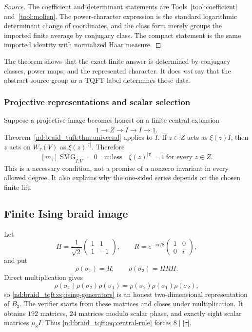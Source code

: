 \documentclass[10pt]{article}
\newcommand{\SMG}{\operatorname{SMG}}
\newcommand{\MGF}{\SMG}
\begin{document}
\begin{proof}[Source]
The coefficient and determinant statements are Tools~\ref{tool:coefficient}
and~\ref{tool:molien}.  The power-character expression is the standard
logarithmic determinant change of coordinates, and the class form merely
groups the imported finite average by conjugacy class.  The compact statement
is the same imported identity with normalized Haar measure.
\end{proof}

The theorem shows that the exact finite answer is determined by conjugacy
classes, power maps, and the represented character.  It does \emph{not} say
that the abstract source group or a TQFT label determines those data.

\subsubsection{Projective representations and scalar selection}

Suppose a projective image becomes honest on a finite central extension
\[
1\longrightarrow Z\longrightarrow\widetilde I\longrightarrow I
\longrightarrow1.
\]
Theorem~\ref{nd:braid_tqft:thm:universal} applies to $\widetilde I$.  If $z\in Z$ acts as
$\xi(z)I$, then $z$ acts on $W_\tau(V)$ as $\xi(z)^{|\tau|}$.  Therefore
\begin{equation}\label{nd:braid_tqft:eq:central-rule}
[m_\tau]\MGF_{\widetilde I,V}=0
\quad\text{unless}\quad
\xi(z)^{|\tau|}=1\ \text{for every }z\in Z.
\end{equation}
This is a necessary condition, not a promise of a nonzero invariant in every
allowed degree.  It also explains why the one-sided series depends on the
chosen finite lift.

\subsection{Finite Ising braid image}

Let
\[
H=\frac1{\sqrt2}\begin{pmatrix}1&1\\1&-1\end{pmatrix},\qquad
R=e^{-\pi i/8}\begin{pmatrix}1&0\\0&i\end{pmatrix},
\]
and put
\begin{equation}\label{nd:braid_tqft:eq:ising-generators}
\rho(\sigma_1)=R,\qquad \rho(\sigma_2)=HRH.
\end{equation}
Direct multiplication gives
\[
\rho(\sigma_1)\rho(\sigma_2)\rho(\sigma_1)
=\rho(\sigma_2)\rho(\sigma_1)\rho(\sigma_2),
\]
so \eqref{nd:braid_tqft:eq:ising-generators} is an honest two-dimensional representation of
$B_3$.  The verifier starts from these matrices and closes under
multiplication.  It obtains $192$ matrices, $24$ matrices modulo scalar phase,
and exactly eight scalar matrices $\mu_8I$.  Thus \eqref{nd:braid_tqft:eq:central-rule}
forces $8\mid |\tau|$.
\end{document}
